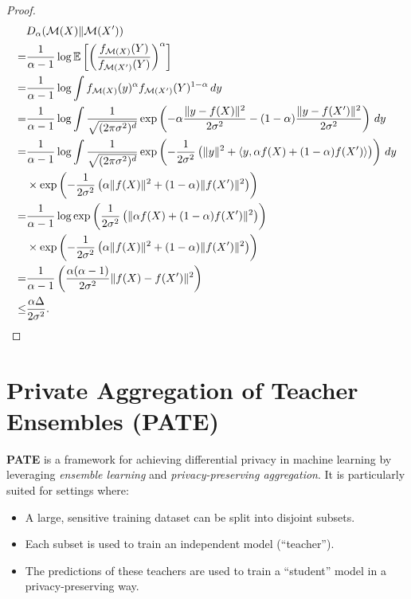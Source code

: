 \documentclass[11pt, a4paper]{article}
\newcommand{\E}[1]{\mathify{\mathbb{E}\left[#1\right]}}
\begin{document}
\begin{proof}
    \begin{align}
        &D_{\alpha} (\cM(X)\| \cM(X'))\\
        =& \frac{1}{\alpha-1} \log \E{\left(\frac{f_{\cM(X)}(Y)}{f_{\cM(X')}(Y)}\right)^\alpha}\\
        =& \frac{1}{\alpha-1} \log \int f_{\cM(X)}(y)^\alpha f_{\cM(X')}(Y)^{1-\alpha}\, dy\\
        =& \frac{1}{\alpha-1} \log \int \frac{1}{\sqrt{(2\pi \sigma^2)^d}} 
            \exp\left(-\alpha \frac{\|y-f(X)\|^2}{2\sigma^2} - (1-\alpha)\frac{\|y-f(X')\|^2}{2\sigma^2}\right)\, dy\\
        =& \frac{1}{\alpha-1} \log \int \frac{1}{\sqrt{(2\pi \sigma^2)^d}} 
            \exp\left(-\frac{1}{2\sigma^2} \left(\|y\|^2  + \langle y, \alpha f(X) + (1-\alpha) f(X')\rangle\right)\right)\, dy\nonumber\\
            &\times \exp\left(-\frac{1}{2\sigma^2}\left( \alpha \|f(X)\|^2 + (1-\alpha)\|f(X')\|^2 \right)\right)\\
        =& \frac{1}{\alpha-1} \log \exp\left(\frac{1}{2\sigma^2}\left( \|\alpha f(X) + (1-\alpha) f(X')\|^2 \right)\right)\nonumber\\
            &\times \exp\left(-\frac{1}{2\sigma^2}\left( \alpha \|f(X)\|^2 + (1-\alpha)\|f(X')\|^2 \right)\right)\\
        =& \frac{1}{\alpha-1}\left(\frac{\alpha(\alpha-1)}{2\sigma^2} \|f(X) - f(X')\|^2\right)\\
        \leq& \frac{\alpha \Delta}{2\sigma^2}.
    \end{align}
\end{proof}




\section{Private Aggregation of Teacher Ensembles (PATE)}
\textbf{PATE} is a framework for achieving differential privacy in machine learning by leveraging \textit{ensemble learning} and \textit{privacy-preserving aggregation}. It is particularly suited for settings where:

\begin{itemize}
    \item A large, sensitive training dataset can be split into disjoint subsets.
    \item Each subset is used to train an independent model (``teacher'').
    \item The predictions of these teachers are used to train a ``student'' model in a privacy-preserving way.
\end{itemize}
\end{document}
